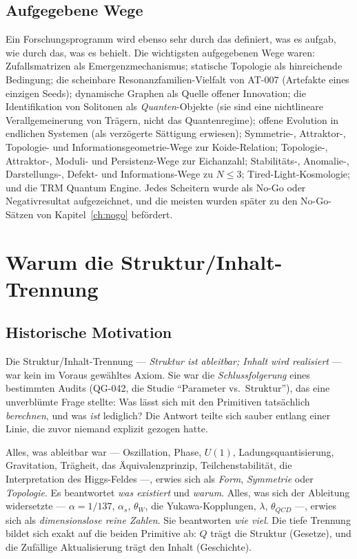 \documentclass[10pt,twoside,openany]{book}
\begin{document}
\section{Aufgegebene Wege}

Ein Forschungsprogramm wird ebenso sehr durch das definiert, was es aufgab, wie durch das,
was es behielt. Die wichtigsten aufgegebenen Wege waren: Zufallsmatrizen als
Emergenzmechanismus; statische Topologie als hinreichende Bedingung; die scheinbare
Resonanzfamilien-Vielfalt von AT-007 (Artefakte eines einzigen Seeds); dynamische Graphen
als Quelle offener Innovation; die Identifikation von Solitonen als \emph{Quanten}-Objekte
(sie sind eine nichtlineare Verallgemeinerung von Trägern, nicht das Quantenregime); offene
Evolution in endlichen Systemen (als verzögerte Sättigung erwiesen); Symmetrie-, Attraktor-,
Topologie- und Informationsgeometrie-Wege zur Koide-Relation; Topologie-, Attraktor-,
Moduli- und Persistenz-Wege zur Eichanzahl; Stabilitäts-, Anomalie-, Darstellungs-, Defekt-
und Informations-Wege zu $N\le3$; Tired-Light-Kosmologie; und die TRM Quantum Engine.
Jedes Scheitern wurde als No-Go oder Negativresultat aufgezeichnet, und die meisten wurden
später zu den No-Go-Sätzen von Kapitel~\ref{ch:nogo} befördert.

\chapter{Warum die Struktur/Inhalt-Trennung}
\label{ch:split}

\section{Historische Motivation}

Die Struktur/Inhalt-Trennung --- \emph{Struktur ist ableitbar; Inhalt wird realisiert} ---
war kein im Voraus gewähltes Axiom. Sie war die \emph{Schlussfolgerung} eines bestimmten
Audits (QG-042, die Studie ``Parameter vs.\ Struktur''), das eine unverblümte Frage
stellte: Was lässt sich mit den Primitiven tatsächlich \emph{berechnen}, und was
\emph{ist} lediglich? Die Antwort teilte sich sauber entlang einer Linie, die zuvor
niemand explizit gezogen hatte.

Alles, was ableitbar war --- Oszillation, Phase, $U(1)$, Ladungsquantisierung,
Gravitation, Trägheit, das Äquivalenzprinzip, Teilchenstabilität, die Interpretation des
Higgs-Feldes ---, erwies sich als \emph{Form}, \emph{Symmetrie} oder \emph{Topologie}. Es
beantwortet \emph{was existiert} und \emph{warum}. Alles, was sich der Ableitung
widersetzte --- $\alpha=1/137$, $\alpha_s$, $\theta_W$, die Yukawa-Kopplungen, $\lambda$,
$\theta_{QCD}$ ---, erwies sich als \emph{dimensionslose reine Zahlen}. Sie beantworten
\emph{wie viel}. Die tiefe Trennung bildet sich exakt auf die beiden Primitive ab: $Q$
trägt die Struktur (Gesetze), und die Zufällige Aktualisierung trägt den Inhalt
(Geschichte).
\end{document}
